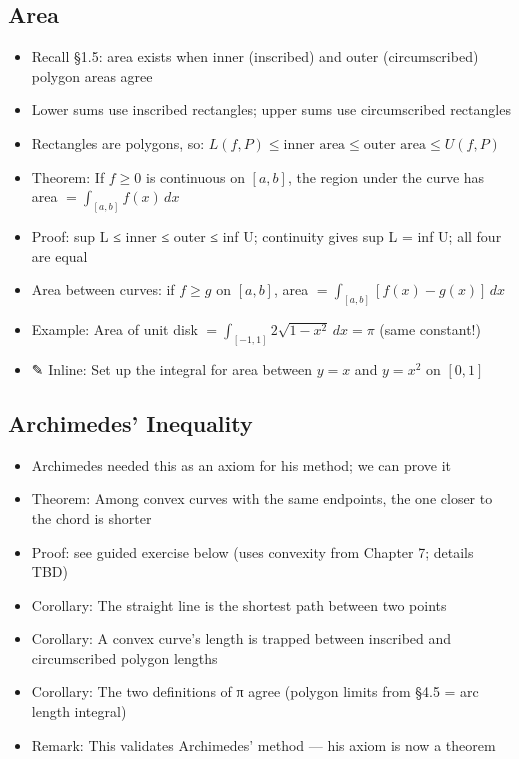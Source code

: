 \documentclass[
  10pt,
  letterpaper,
]{scrbook}
\providecommand{\tightlist}{%
  \setlength{\itemsep}{0pt}\setlength{\parskip}{0pt}}
\begin{document}
\subsection{Area}\label{area}

\begin{itemize}
\tightlist
\item
  Recall §1.5: area exists when inner (inscribed) and outer
  (circumscribed) polygon areas agree
\item
  Lower sums use inscribed rectangles; upper sums use circumscribed
  rectangles
\item
  Rectangles are polygons, so:
  \(L(f, P) \leq \text{inner area} \leq \text{outer area} \leq U(f, P)\)
\item
  Theorem: If \(f \geq 0\) is continuous on \([a,b]\), the region under
  the curve has area \(= \int_{[a,b]} f(x) \, dx\)
\item
  Proof: sup L ≤ inner ≤ outer ≤ inf U; continuity gives sup L = inf U;
  all four are equal
\item
  Area between curves: if \(f \geq g\) on \([a,b]\), area
  \(= \int_{[a,b]} [f(x) - g(x)] \, dx\)
\item
  Example: Area of unit disk
  \(= \int_{[-1,1]} 2\sqrt{1-x^2} \, dx = \pi\) (same constant!)
\item
  ✎ Inline: Set up the integral for area between \(y = x\) and
  \(y = x^2\) on \([0,1]\)
\end{itemize}

\subsection{Archimedes' Inequality}\label{archimedes-inequality}

\begin{itemize}
\tightlist
\item
  Archimedes needed this as an axiom for his method; we can prove it
\item
  Theorem: Among convex curves with the same endpoints, the one closer
  to the chord is shorter
\item
  Proof: see guided exercise below (uses convexity from Chapter 7;
  details TBD)
\item
  Corollary: The straight line is the shortest path between two points
\item
  Corollary: A convex curve's length is trapped between inscribed and
  circumscribed polygon lengths
\item
  Corollary: The two definitions of π agree (polygon limits from §4.5 =
  arc length integral)
\item
  Remark: This validates Archimedes' method --- his axiom is now a
  theorem
\end{itemize}
\end{document}
